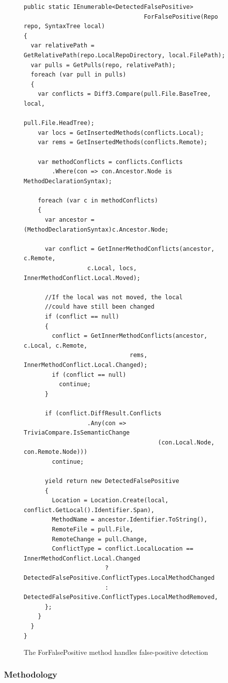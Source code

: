 \documentclass[draftclsnofoot,onecolumn]{IEEEtran}
\begin{document}
\begin{figure}[!p]
\centering
\begin{lstlisting}
public static IEnumerable<DetectedFalsePositive> 
                                  ForFalsePositive(Repo repo, SyntaxTree local)
{
  var relativePath = GetRelativePath(repo.LocalRepoDirectory, local.FilePath);
  var pulls = GetPulls(repo, relativePath);
  foreach (var pull in pulls)
  {
    var conflicts = Diff3.Compare(pull.File.BaseTree, local, 
                                                        pull.File.HeadTree);
    var locs = GetInsertedMethods(conflicts.Local);
    var rems = GetInsertedMethods(conflicts.Remote);

    var methodConflicts = conflicts.Conflicts
        .Where(con => con.Ancestor.Node is MethodDeclarationSyntax);

    foreach (var c in methodConflicts)
    {
      var ancestor = (MethodDeclarationSyntax)c.Ancestor.Node;

      var conflict = GetInnerMethodConflicts(ancestor, c.Remote,
                  c.Local, locs, InnerMethodConflict.Local.Moved);

      //If the local was not moved, the local 
      //could have still been changed
      if (conflict == null)
      {
        conflict = GetInnerMethodConflicts(ancestor, c.Local, c.Remote, 
                              rems, InnerMethodConflict.Local.Changed);
        if (conflict == null)
          continue;
      }

      if (conflict.DiffResult.Conflicts
                  .Any(con => TriviaCompare.IsSemanticChange
                                      (con.Local.Node, con.Remote.Node)))
        continue;

      yield return new DetectedFalsePositive
      {
        Location = Location.Create(local, conflict.GetLocal().Identifier.Span),
        MethodName = ancestor.Identifier.ToString(),
        RemoteFile = pull.File,
        RemoteChange = pull.Change,
        ConflictType = conflict.LocalLocation == InnerMethodConflict.Local.Changed
                       ? DetectedFalsePositive.ConflictTypes.LocalMethodChanged
                       : DetectedFalsePositive.ConflictTypes.LocalMethodRemoved,
      };
    }
  }
}
\end{lstlisting}
\caption{The ForFalsePositive method handles false-positive detection}
\label{anforfp}
\end{figure}

\subsubsection{Methodology}
\end{document}
